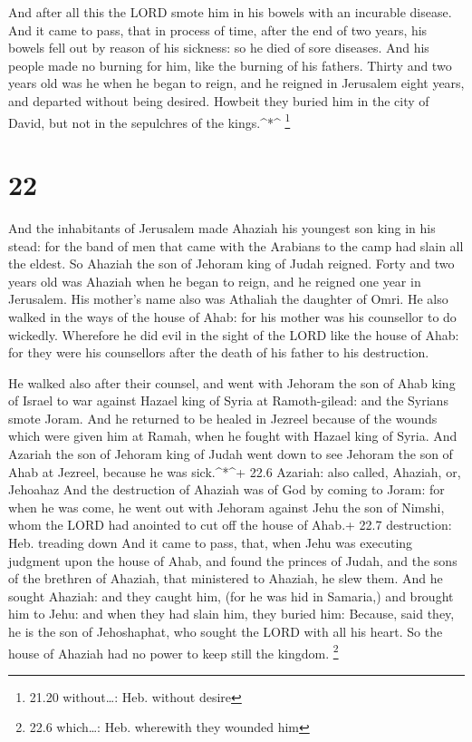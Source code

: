  And after all this the LORD smote him in his bowels with
an incurable disease.  And it came to pass, that in process
of time, after the end of two years, his bowels fell out by reason of
his sickness: so he died of sore diseases. And his people made no
burning for him, like the burning of his fathers.  Thirty
and two years old was he when he began to reign, and he reigned in
Jerusalem eight years, and departed without being desired. Howbeit they
buried him in the city of David, but not in the sepulchres of the
kings.\^{}*\^{} \footnote{21.20 without\ldots: Heb. without desire}

\hypertarget{section-21}{%
\section{22}\label{section-21}}

 And the inhabitants of Jerusalem made Ahaziah his youngest
son king in his stead: for the band of men that came with the Arabians
to the camp had slain all the eldest. So Ahaziah the son of Jehoram king
of Judah reigned.  Forty and two years old was Ahaziah when
he began to reign, and he reigned one year in Jerusalem. His mother's
name also was Athaliah the daughter of Omri.  He also walked
in the ways of the house of Ahab: for his mother was his counsellor to
do wickedly.  Wherefore he did evil in the sight of the LORD
like the house of Ahab: for they were his counsellors after the death of
his father to his destruction.

 He walked also after their counsel, and went with Jehoram
the son of Ahab king of Israel to war against Hazael king of Syria at
Ramoth-gilead: and the Syrians smote Joram.  And he returned
to be healed in Jezreel because of the wounds which were given him at
Ramah, when he fought with Hazael king of Syria. And Azariah the son of
Jehoram king of Judah went down to see Jehoram the son of Ahab at
Jezreel, because he was sick.\^{}*\^{}+ 22.6 Azariah: also called,
Ahaziah, or, Jehoahaz  And the destruction of Ahaziah was of
God by coming to Joram: for when he was come, he went out with Jehoram
against Jehu the son of Nimshi, whom the LORD had anointed to cut off
the house of Ahab.+ 22.7 destruction: Heb. treading down 
And it came to pass, that, when Jehu was executing judgment upon the
house of Ahab, and found the princes of Judah, and the sons of the
brethren of Ahaziah, that ministered to Ahaziah, he slew them.
 And he sought Ahaziah: and they caught him, (for he was hid
in Samaria,) and brought him to Jehu: and when they had slain him, they
buried him: Because, said they, he is the son of Jehoshaphat, who sought
the LORD with all his heart. So the house of Ahaziah had no power to
keep still the kingdom. \footnote{22.6 which\ldots: Heb. wherewith they
  wounded him}

